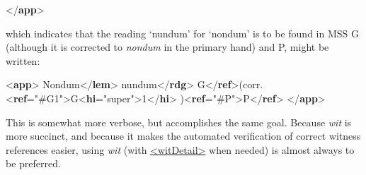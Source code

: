 \begin{shaded}
{</\textbf{app}>}\end{shaded}\egroup\par \noindent  which indicates that the reading ‘nundum’ for ‘nondum’ is to be found in MSS G (although it is corrected to \textit{nondum} in the primary hand) and P, might be written: \par\bgroup{}\exampleFont \begin{shaded}\noindent\mbox{}{<\textbf{app}>}\mbox{}\newline 
{}Nondum{</\textbf{lem}>}\mbox{}\newline 
{}nundum{</\textbf{rdg}>}\mbox{}\newline 
{}\mbox{}\newline 
\hspace*{1em}G{</\textbf{ref}>}(corr. {<\textbf{ref}\hspace*{1em}{target}="{\#G1}">}G{<\textbf{hi}\hspace*{1em}{rend}="{super}">}1{</\textbf{hi}>}\mbox{}\newline 
\hspace*{1em}){<\textbf{ref}\hspace*{1em}{target}="{\#P}">}P{</\textbf{ref}>}\mbox{}\newline 
{}\mbox{}\newline 
{</\textbf{app}>}\end{shaded}\egroup\par \noindent  This is somewhat more verbose, but accomplishes the same goal. Because {\itshape wit} is more succinct, and because it makes the automated verification of correct witness references easier, using {\itshape wit} (with \hyperref[TEI.witDetail]{<witDetail>} when needed) is almost always to be preferred.
